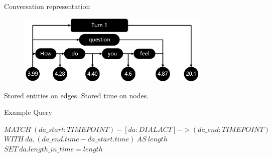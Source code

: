 \begin{frame}{Conversation representation}
\begin{figure}[ht!]
\centering
\includegraphics[width=25em]{../latex/graph5.jpg}\vspace{-1em}
\end{figure}

     Stored entities on edges. Stored time on nodes.
    \begin{alertblock}{Example Query}
    
     $MATCH\:(da\_start:TIMEPOINT)-[da:DIALACT]->(da\_end:TIMEPOINT)$\\
            $WITH\:da, (da\_end.time - da\_start.time)\:AS\:length$\\
            $SET\:da.length\_in\_time = length$
    
    
    
    \end{alertblock}
\end{frame}



